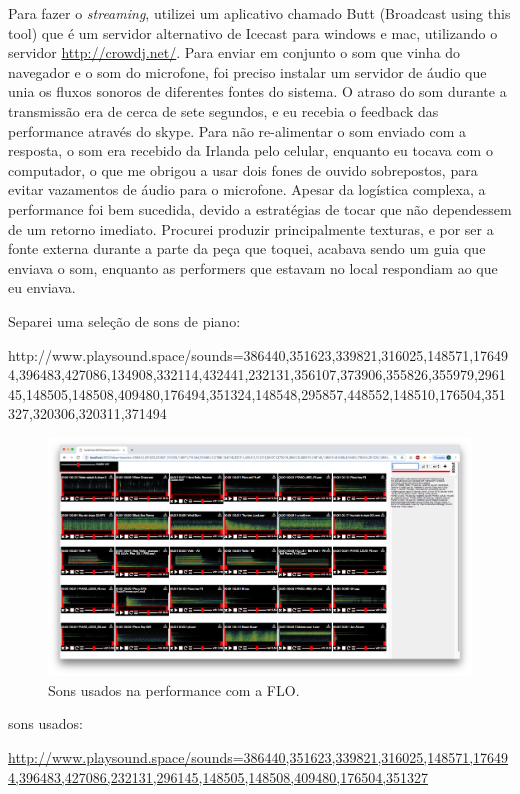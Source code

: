 Para fazer o \emph{streaming}, utilizei um aplicativo chamado Butt (Broadcast using this tool) que é um servidor alternativo de Icecast para windows e mac, utilizando o servidor \url{http://crowdj.net/}. Para enviar em conjunto o som que vinha do navegador e o som do microfone, foi preciso instalar um servidor de áudio que unia os fluxos sonoros de diferentes fontes do sistema. O atraso do som durante a transmissão era de cerca de sete segundos, e eu recebia o feedback das performance através do skype. Para não re-alimentar o som enviado com a resposta, o som era recebido da Irlanda pelo celular, enquanto eu tocava com o computador, o que me obrigou a usar dois fones de ouvido sobrepostos, para evitar vazamentos de áudio para o microfone. Apesar da logística complexa, a performance foi bem sucedida, devido a estratégias de tocar que não dependessem de um retorno imediato. Procurei produzir principalmente texturas, e por ser a fonte externa durante a parte da peça que toquei, acabava sendo um guia que enviava o som, enquanto as performers que estavam no local respondiam ao que eu enviava. 


Separei uma seleção de sons de piano: 


http://www.playsound.space/sounds=386440,351623,339821,316025,148571,176494,396483,427086,134908,332114,432441,232131,356107,373906,355826,355979,296145,148505,148508,409480,176494,351324,148548,295857,448552,148510,176504,351327,320306,320311,371494

\begin{figure}


\includegraphics[width=0.7\linewidth]{pictures/cap4/playsound_sarc}
\caption{Sons usados na performance com a FLO.}
\label{telasarc}
\end{figure}

sons usados:

\url{http://www.playsound.space/sounds=386440,351623,339821,316025,148571,176494,396483,427086,232131,296145,148505,148508,409480,176504,351327}

